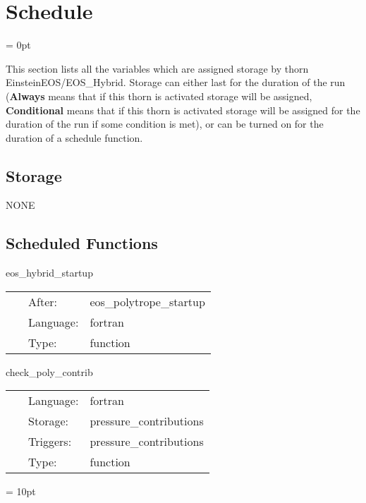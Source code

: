 
\section{Schedule} 


\parskip = 0pt


\noindent This section lists all the variables which are assigned storage by thorn EinsteinEOS/EOS\_Hybrid.  Storage can either last for the duration of the run ({\bf Always} means that if this thorn is activated storage will be assigned, {\bf Conditional} means that if this thorn is activated storage will be assigned for the duration of the run if some condition is met), or can be turned on for the duration of a schedule function.


\subsection*{Storage}NONE
\subsection*{Scheduled Functions}
\vspace{5mm}


\hspace{5mm} eos\_hybrid\_startup 

\hspace{5mm}{\it setup the eos used by dimmelmeier et al. in core collapse } 


\hspace{5mm}

 \begin{tabular*}{160mm}{cll} 
~ & After:  & eos\_polytrope\_startup \\ 
~ & Language:  & fortran \\ 
~ & Type:  & function \\ 
\end{tabular*} 


\vspace{5mm}


\hspace{5mm} check\_poly\_contrib 

\hspace{5mm}{\it output the polytropic and thermal contributions } 


\hspace{5mm}

 \begin{tabular*}{160mm}{cll} 
~ & Language:  & fortran \\ 
~ & Storage:  & pressure\_contributions \\ 
~ & Triggers:  & pressure\_contributions \\ 
~ & Type:  & function \\ 
\end{tabular*} 



\vspace{5mm}\parskip = 10pt 
